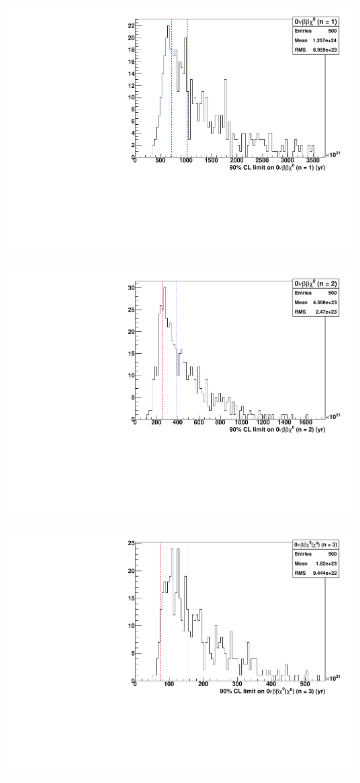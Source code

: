 \documentclass[herrin-thesis.tex]{subfiles}
\begin{document}
\begin{figure}[htp]
\centering
	\begin{subfigure}[c]{0.48\textwidth}
	\centering
	\includegraphics[width=\textwidth]{./plots/analysis_bb0nX1_sensitivity.pdf}
	\end{subfigure}\hfill%
	\begin{subfigure}[c]{0.48\textwidth}
	\centering
	\includegraphics[width=\textwidth]{./plots/analysis_bb0nX2_sensitivity.pdf}
	\end{subfigure}
	\begin{subfigure}[c]{0.48\textwidth}
	\centering
	\includegraphics[width=\textwidth]{./plots/analysis_bb0nX3_sensitivity.pdf}

\end{subfigure}
\end{figure}
\end{document}
